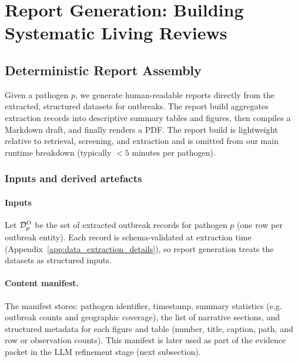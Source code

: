 \clearpage
\section{Report Generation: Building Systematic Living Reviews}
\label{app:report_generation_methods}

\subsection{Deterministic Report Assembly}
Given a pathogen $p$, we generate human-readable reports directly from the extracted, structured datasets for outbreaks.
The report build aggregates extraction records into descriptive summary tables and figures, then compiles a Markdown draft, and finally renders a PDF. The report build is lightweight relative to retrieval, screening, and extraction and is omitted from our main runtime breakdown (typically $<5$ minutes per pathogen).

\subsubsection*{Inputs and derived artefacts}
\paragraph{Inputs}
Let $\mathcal{D}^{\textsc{O}}_p$ be the set of extracted outbreak records for pathogen $p$ (one row per outbreak entity).
Each record is schema-validated at extraction time (Appendix~\ref{app:data_extraction_details}), so report generation treats the datasets as structured inputs.

\paragraph{Content manifest.}
The manifest stores: pathogen identifier, timestamp, summary statistics (e.g. outbreak counts and geographic coverage), the list of narrative sections, and structured metadata for each figure and table (number, title, caption, path, and row or observation counts). This manifest is later used as part of the evidence packet in the LLM refinement stage (next subsection).


